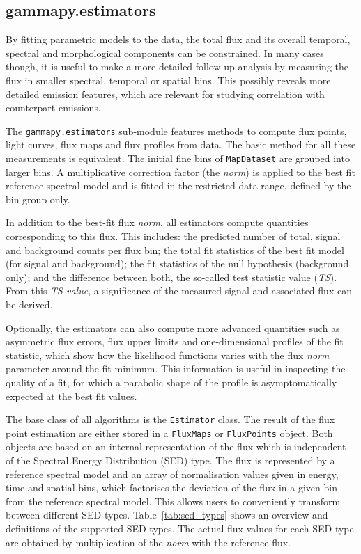 \documentclass[longauth]{aa}
\newcommand{\code}[1]{\texttt{#1}}
\begin{document}
\subsection{gammapy.estimators}
\label{ssec:gammapy-estimators}
By fitting parametric models to the data, the total \gammaray
flux and its overall temporal, spectral and morphological components can be constrained.
In many cases though, it is useful to make a more detailed follow-up analysis by measuring the
flux in smaller spectral, temporal or spatial bins. This
possibly reveals more detailed emission features, which
are relevant for studying correlation with counterpart emissions.

The \code{gammapy.estimators} sub-module features methods to compute flux
points, light curves, flux maps and flux profiles from data.
The basic method for all these measurements is equivalent.
The initial fine bins of \code{MapDataset} are grouped into
larger bins. A multiplicative correction factor (the \textit{norm})
is applied to the best fit reference spectral
model and is fitted in the restricted data range, defined by the 
bin group only.

In addition to the best-fit flux \textit{norm}, all estimators compute
quantities corresponding to this flux. This includes:
the predicted number of total, signal and background
counts per flux bin; the total fit statistics
of the best fit model (for signal and background); the fit statistics of the
null hypothesis (background only); and the difference between both,
the so-called test statistic value (\textit{TS}).
From this \textit{TS value}, a significance of the measured signal and associated flux
can be derived.

Optionally, the estimators can also compute more advanced quantities
such as asymmetric flux errors, flux upper limits
and one-dimensional profiles of the fit statistic,
which show how the likelihood functions varies with
the flux \textit{norm} parameter around the fit minimum.
This information is useful in inspecting the quality
of a fit, for which a parabolic
shape of the profile is asymptomatically expected at the best fit
values.

The base class of all algorithms is the \code{Estimator}  class.
The result of the flux point estimation are either stored in a
\code{FluxMaps} or \code{FluxPoints} object. Both objects
are based on an internal representation of the flux which is
independent of the Spectral Energy Distribution (SED) type. The flux is represented
by a reference spectral model and an array of
normalisation values given in energy, time and spatial bins,
which factorises the deviation of the flux in a given
bin from the reference spectral model. This allows
users to conveniently transform between different
SED types. Table~\ref{tab:sed_types} shows an
overview and definitions of the supported SED types.
The actual flux values for each SED type are obtained
by multiplication of the \textit{norm} with the reference flux.
\end{document}
